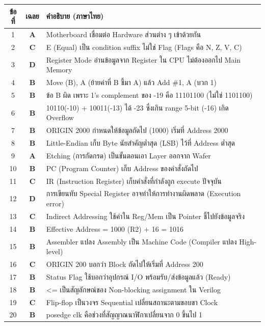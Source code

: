 \documentclass[a4paper,12pt]{article}
\begin{document}
\renewcommand{\arraystretch}{1.2}
\begin{center}
\begin{tabular}{|c|c|l|}
\hline
\rowcolor[gray]{0.8} \textbf{ข้อที่} & \textbf{เฉลย} & \textbf{คำอธิบาย (ภาษาไทย)} \\ \hline
1 & \textbf{A} & Motherboard เชื่อมต่อ Hardware ส่วนต่าง ๆ เข้าด้วยกัน \\ \hline
2 & \textbf{C} & E (Equal) เป็น condition suffix ไม่ใช่ Flag (Flags คือ N, Z, V, C) \\ \hline
3 & \textbf{D} & Register Mode อ่านข้อมูลจาก Register ใน CPU ไม่ต้องออกไป Main Memory \\ \hline
4 & \textbf{B} & Move (B), A (ย้ายค่าที่ B ชี้มา A) แล้ว Add \#1, A (บวก 1) \\ \hline
5 & \textbf{B} & ข้อ B ผิด เพราะ 1's complement ของ -19 คือ 11101100 (ไม่ใช่ 1101100) \\ \hline
6 & \textbf{B} & 10110(-10) + 10011(-13) ได้ -23 ซึ่งเกิน range 5-bit (-16) เกิด Overflow \\ \hline
7 & \textbf{B} & ORIGIN 2000 กำหนดให้ข้อมูลถัดไป (1000) เริ่มที่ Address 2000 \\ \hline
8 & \textbf{B} & Little-Endian เก็บ Byte นัยสำคัญต่ำสุด (LSB) ไว้ที่ Address ต่ำสุด \\ \hline
9 & \textbf{A} & Etching (การกัดกรด) เป็นขั้นตอนเอา Layer ออกจาก Wafer \\ \hline
10 & \textbf{B} & PC (Program Counter) เก็บ Address ของคำสั่งถัดไป \\ \hline
11 & \textbf{C} & IR (Instruction Register) เก็บคำสั่งที่กำลังถูก execute ปัจจุบัน \\ \hline
12 & \textbf{D} & การเขียนทับ Special Register อาจทำให้การทำงานผิดพลาด (Execution error) \\ \hline
13 & \textbf{C} & Indirect Addressing ใช้ค่าใน Reg/Mem เป็น Pointer ชี้ไปยังข้อมูลจริง \\ \hline
14 & \textbf{B} & Effective Address = 1000 (R2) + 16 = 1016 \\ \hline
15 & \textbf{B} & Assembler แปลง Assembly เป็น Machine Code (Compiler แปลง High-level) \\ \hline
16 & \textbf{C} & ORIGIN 200 บอกว่า Block ถัดไปให้เริ่มที่ Address 200 \\ \hline
17 & \textbf{B} & Status Flag ใช้บอกว่าอุปกรณ์ I/O พร้อมรับ/ส่งข้อมูลแล้ว (Ready) \\ \hline
18 & \textbf{B} & <= เป็นสัญลักษณ์ของ Non-blocking assignment ใน Verilog \\ \hline
19 & \textbf{C} & Flip-flop เป็นวงจร Sequential เปลี่ยนสถานะตามขอบขา Clock \\ \hline
20 & \textbf{B} & posedge clk คือช่วงที่สัญญาณนาฬิกาเปลี่ยนจาก 0 ขึ้นไป 1 \\ \hline
\end{tabular}
\end{center}
\end{document}

